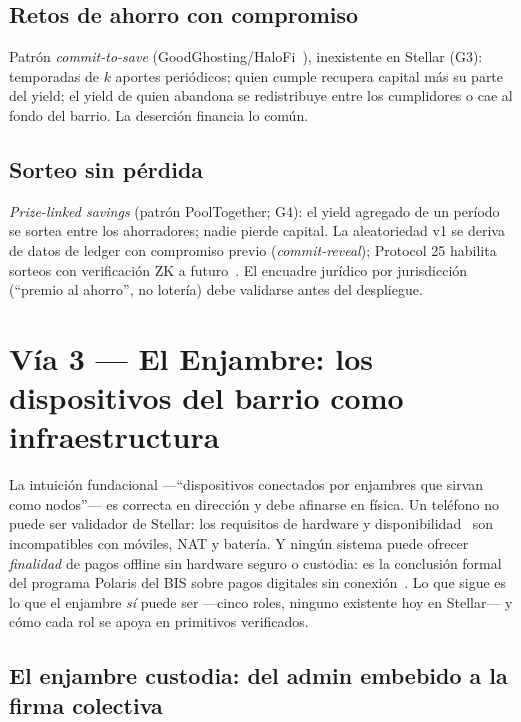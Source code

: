 \documentclass[twocolumn,10pt]{article}
\begin{document}
\subsection{Retos de ahorro con compromiso}

Patr\'on \emph{commit-to-save} (GoodGhosting/HaloFi~\cite{goodghosting}), inexistente en Stellar (G3): temporadas de $k$ aportes peri\'odicos; quien cumple recupera capital m\'as su parte del yield; el yield de quien abandona se redistribuye entre los cumplidores o cae al fondo del barrio. La deserci\'on financia lo com\'un.

\subsection{Sorteo sin p\'erdida}

\emph{Prize-linked savings} (patr\'on PoolTogether; G4): el yield agregado de un per\'iodo se sortea entre los ahorradores; nadie pierde capital. La aleatoriedad v1 se deriva de datos de ledger con compromiso previo (\emph{commit-reveal}); Protocol 25 habilita sorteos con verificaci\'on ZK a futuro~\cite{p25}. El encuadre jur\'idico por jurisdicci\'on (``premio al ahorro'', no loter\'ia) debe validarse antes del despliegue.

\section{V\'ia 3 --- El Enjambre: los dispositivos del barrio como infraestructura}
\label{sec:via3}

La intuici\'on fundacional ---``dispositivos conectados por enjambres que sirvan como nodos''--- es correcta en direcci\'on y debe afinarse en f\'isica. Un tel\'efono no puede ser validador de Stellar: los requisitos de hardware y disponibilidad~\cite{prereq} son incompatibles con m\'oviles, NAT y bater\'ia. Y ning\'un sistema puede ofrecer \emph{finalidad} de pagos offline sin hardware seguro o custodia: es la conclusi\'on formal del programa Polaris del BIS sobre pagos digitales sin conexi\'on~\cite{polaris}. Lo que sigue es lo que el enjambre \emph{s\'i} puede ser ---cinco roles, ninguno existente hoy en Stellar--- y c\'omo cada rol se apoya en primitivos verificados.

\subsection{El enjambre custodia: del admin embebido a la firma colectiva}
\label{sec:custodia}
\end{document}
